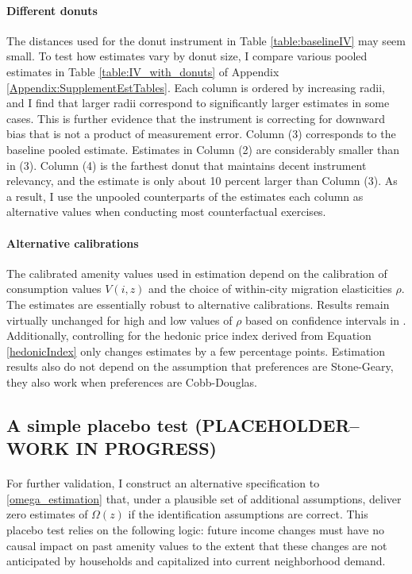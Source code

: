 \documentclass[11pt]{article}
\begin{document}
\paragraph{Different donuts} The distances used for the donut instrument in Table \ref{table:baselineIV} may seem small. To test how estimates vary by donut size, I compare various pooled estimates in Table \ref{table:IV_with_donuts} of Appendix \ref{Appendix:SupplementEstTables}. Each column is ordered by increasing radii, and I find that larger radii correspond to significantly larger estimates in some cases. This is further evidence that the instrument is correcting for downward bias that is not a product of measurement error. Column (3) corresponds to the baseline pooled estimate. Estimates in Column (2) are considerably smaller than in (3). Column (4) is the farthest donut that maintains decent instrument relevancy, and the estimate is only about 10 percent larger than Column (3). As a result, I use the unpooled counterparts of the estimates each column as alternative values when conducting most counterfactual exercises. 
 
\paragraph*{Alternative calibrations} The calibrated amenity values used in estimation depend on the calibration of consumption values $V(i, z)$ and the choice of within-city migration elasticities $\rho$. The estimates are essentially robust to alternative calibrations. Results remain virtually unchanged for high and low values of $\rho$ based on confidence intervals in \cite{BSH}. Additionally, controlling for the hedonic price index derived from Equation \eqref{hedonicIndex} only changes estimates by a few percentage points. Estimation results also do not depend on the assumption that preferences are Stone-Geary, they also work when preferences are Cobb-Douglas. 

\subsection{A simple placebo test (PLACEHOLDER--WORK IN PROGRESS)} 
\paragraph*{}
For further validation, I construct an alternative specification to \eqref{omega_estimation} that, under a plausible set of additional assumptions, deliver zero estimates of $\Omega(z)$ if the identification assumptions are correct. This placebo test relies on the following logic: future income changes must have no causal impact on past amenity values to the extent that these changes are not anticipated by households and capitalized into current neighborhood demand. 
\end{document}

